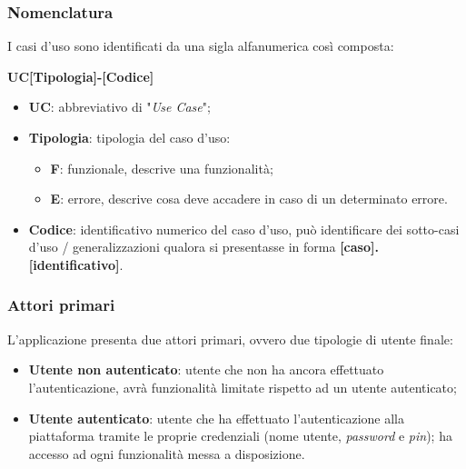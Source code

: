 \subsubsection*{Nomenclatura}
I casi d'uso sono identificati da una sigla alfanumerica così composta:
\begin{center}
    \textbf{UC[Tipologia]-[Codice]}
\end{center}

\begin{itemize}
    \item \textbf{UC}: abbreviativo di "\textit{Use Case}";
    \item \textbf{Tipologia}: tipologia del caso d'uso:
        \begin{itemize}
            \item \textbf{F}: funzionale, descrive una funzionalità;
            \item \textbf{E}: errore, descrive cosa deve accadere in caso di un determinato errore.
        \end{itemize}
    \item \textbf{Codice}: identificativo numerico del caso d’uso, può identificare dei sotto-casi d’uso / generalizzazioni qualora si presentasse in forma \textbf{[caso].[identificativo]}.
\end{itemize}

\subsubsection*{Attori primari}
L’applicazione presenta due attori primari, ovvero due tipologie di utente finale:
\begin{itemize}
    \item \textbf{Utente non autenticato}: utente che non ha ancora effettuato l’autenticazione, avrà funzionalità limitate rispetto ad un utente autenticato;
    \item \textbf{Utente autenticato}: utente che ha effettuato l’autenticazione alla piattaforma tramite le proprie credenziali (nome utente, \textit{password} e \textit{pin}); ha accesso ad ogni funzionalità messa a disposizione.
\end{itemize}

\label{subsubsec:casi-d'uso}
